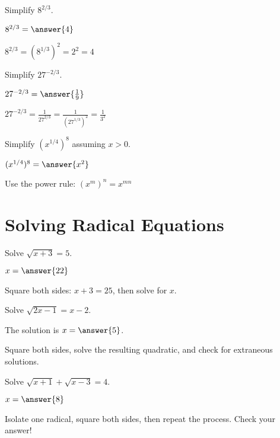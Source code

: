 \documentclass{ximera}
\begin{document}
\begin{problem}
Simplify $8^{2/3}$.

$8^{2/3} = \answer{4}$

\begin{hint}
$8^{2/3} = (8^{1/3})^2 = 2^2 = 4$
\end{hint}
\end{problem}

\begin{problem}
Simplify $27^{-2/3}$.

$27^{-2/3} = \answer{\frac{1}{9}}$

\begin{hint}
$27^{-2/3} = \frac{1}{27^{2/3}} = \frac{1}{(27^{1/3})^2} = \frac{1}{3^2}$
\end{hint}
\end{problem}

\begin{problem}
Simplify $(x^{1/4})^8$ assuming $x > 0$.

$(x^{1/4})^8 = \answer{x^2}$

\begin{hint}
Use the power rule: $(x^m)^n = x^{mn}$
\end{hint}
\end{problem}

\section{Solving Radical Equations}

\begin{problem}
Solve $\sqrt{x + 3} = 5$.

$x = \answer{22}$

\begin{hint}
Square both sides: $x + 3 = 25$, then solve for $x$.
\end{hint}
\end{problem}

\begin{problem}
Solve $\sqrt{2x - 1} = x - 2$.

The solution is $x = \answer{5}$.

\begin{hint}
Square both sides, solve the resulting quadratic, and check for extraneous solutions.
\end{hint}
\end{problem}

\begin{problem}
Solve $\sqrt{x + 1} + \sqrt{x - 3} = 4$.

$x = \answer{8}$

\begin{hint}
Isolate one radical, square both sides, then repeat the process. Check your answer!
\end{hint}
\end{problem}
\end{document}
